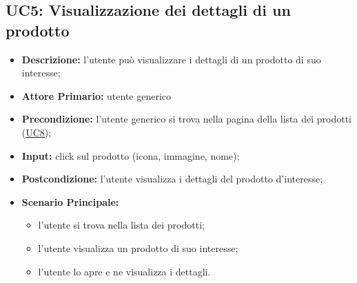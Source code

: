 \subsection{UC5: Visualizzazione dei dettagli di un prodotto}
\label{sec:UC5}
\begin{itemize}
    \item \textbf{Descrizione:} l'utente può visualizzare i dettagli di un prodotto di suo interesse;
    \item \textbf{Attore Primario:} utente generico
    \item \textbf{Precondizione:} l'utente generico si trova nella pagina della lista dei prodotti (\hyperref[sec:UC8]{\underline{UC8}});
    \item \textbf{Input:} click sul prodotto (icona, immagine, nome);
    \item \textbf{Postcondizione:} l'utente visualizza i dettagli del prodotto d'interesse;
    \item \textbf{Scenario Principale:}
          \begin{itemize}
              \item l'utente si trova nella lista dei prodotti;
              \item l'utente visualizza un prodotto di suo interesse;
              \item l'utente lo apre e ne visualizza i dettagli.
          \end{itemize}
\end{itemize}